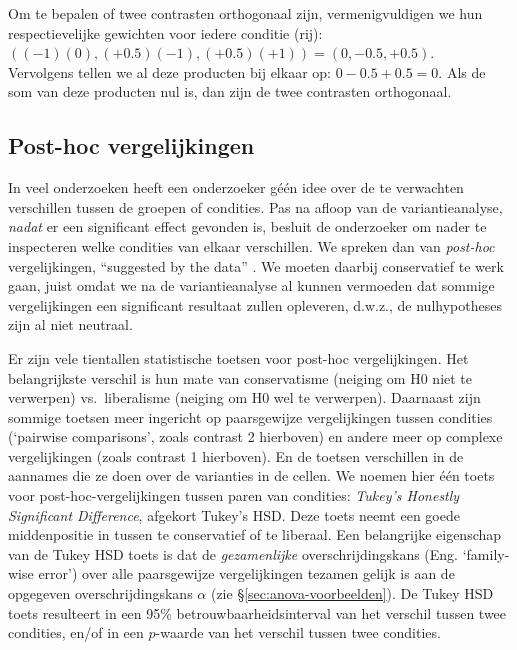 \documentclass[
]{book}
\begin{document}
Om te bepalen of twee contrasten orthogonaal zijn, vermenigvuldigen we
hun respectievelijke gewichten voor iedere conditie (rij):\\
\(( (-1)(0), (+0.5)(-1), (+0.5)(+1) )= (0, -0.5, +0.5)\).\\
Vervolgens tellen we al deze producten bij elkaar op:
\(0 -0.5 + 0.5 = 0\). Als de som van deze producten nul is, dan zijn de
twee contrasten orthogonaal.

\subsection{Post-hoc vergelijkingen}\label{sec:anova-oneway-posthoc}

In veel onderzoeken heeft een onderzoeker géén idee over de te
verwachten verschillen tussen de groepen of condities. Pas na afloop van
de variantieanalyse, \emph{nadat} er een significant effect gevonden is,
besluit de onderzoeker om nader te inspecteren welke condities van
elkaar verschillen. We spreken dan van \emph{post-hoc} vergelijkingen,
``suggested by the data'' \citep[ p.200]{MD04}. We moeten daarbij conservatief te
werk gaan, juist omdat we na de variantieanalyse al kunnen vermoeden dat
sommige vergelijkingen een significant resultaat zullen opleveren,
d.w.z., de nulhypotheses zijn al niet neutraal.

Er zijn vele tientallen statistische toetsen voor post-hoc
vergelijkingen. Het belangrijkste verschil is hun mate van conservatisme
(neiging om H0 niet te verwerpen) vs.~liberalisme (neiging om H0 wel te
verwerpen). Daarnaast zijn sommige toetsen meer ingericht op
paarsgewijze vergelijkingen tussen condities (`pairwise comparisons',
zoals contrast 2 hierboven) en andere meer op complexe vergelijkingen
(zoals contrast 1 hierboven). En de toetsen verschillen in de aannames
die ze doen over de varianties in de cellen. We noemen hier één toets
voor post-hoc-vergelijkingen tussen paren van condities: \emph{Tukey's
Honestly Significant Difference}, afgekort Tukey's HSD. Deze toets neemt
een goede middenpositie in tussen te conservatief of te liberaal. Een
belangrijke eigenschap van de Tukey HSD toets is dat de \emph{gezamenlijke}
overschrijdingskans (Eng. `family-wise error') over alle paarsgewijze
vergelijkingen tezamen gelijk is aan de opgegeven overschrijdingskans
\(\alpha\) (zie §\ref{sec:anova-voorbeelden}). De Tukey HSD toets resulteert in
een 95\% betrouwbaarheidsinterval van het verschil tussen twee condities,
en/of in een \(p\)-waarde van het verschil tussen twee condities.
\end{document}
